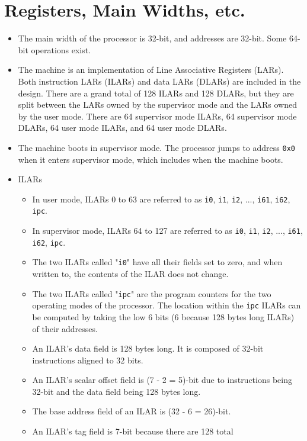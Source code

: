 \documentclass{article}
\begin{document}
\section{Registers, Main Widths, etc.}
	\begin{itemize}
	\item The main width of the processor is 32-bit, and addresses are
		32-bit. Some 64-bit operations exist.
	\item The machine is an implementation of Line Associative Registers
		(LARs). Both instruction LARs (ILARs) and data LARs (DLARs) are
		included in the design. There are a grand total of 128 ILARs and
		128 DLARs, but they are split between the LARs owned by the
		supervisor mode and the LARs owned by the user mode. There are 64
		supervisor mode ILARs, 64 supervisor mode DLARs, 64 user mode
		ILARs, and 64 user mode DLARs.
	\item The machine boots in supervisor mode. The processor jumps to
		address \texttt{0x0} when it enters supervisor mode, which includes
		when the machine boots.
	\item ILARs
		\begin{itemize}
		\item In user mode, ILARs 0 to 63 are referred to as \texttt{i0},
			\texttt{i1}, \texttt{i2}, ..., \texttt{i61}, \texttt{i62},
			\texttt{ipc}.
		\item In supervisor mode, ILARs 64 to 127 are referred to as
			\texttt{i0}, \texttt{i1}, \texttt{i2}, ..., \texttt{i61},
			\texttt{i62}, \texttt{ipc}.
		\item The two ILARs called "\texttt{i0}" have all their
			fields set to zero, and when written to, the contents of the
			ILAR does not change.
		\item The two ILARs called "\texttt{ipc}" are the program counters
			for the two operating modes of the processor. The location
			within the \texttt{ipc} ILARs can be computed by taking the low
			6 bits (6 because 128 bytes long ILARs) of their addresses.
		\item An ILAR's data field is 128 bytes long. It is composed of
			32-bit instructions aligned to 32 bits.
		\item An ILAR's scalar offset field is (7 - 2 = 5)-bit due to
			instructions being 32-bit and the data field being 128 bytes
			long.
		\item The base address field of an ILAR is (32 - 6 = 26)-bit.
		\item An ILAR's tag field is 7-bit because there are 128 total

\end{itemize}
\end{itemize}
\end{document}
